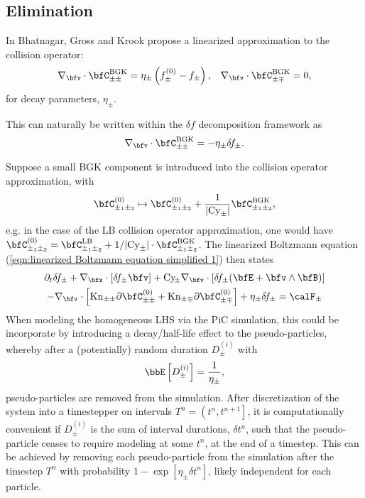 \subsection*{Elimination}
    \begin{definition}
        In \cite{Bhatnagar_Gross_Krook_1954} Bhatnagar, Gross and Krook propose a linearized approximation to the collision operator:
        \begin{align}
            \nabla_{\bfv}\cdot\bfC_{\pm\pm}^{\rm BGK}  =  \eta_{\pm}\left(f_{\pm}^{(0)} - f_{\pm}\right),  &&
            \nabla_{\bfv}\cdot\bfC_{\pm\mp}^{\rm BGK}  =  0,
        \end{align}
        for decay parameters, $\eta_{\pm}$.
    \end{definition}
    This can naturally be written within the $\delta\!f$ decomposition framework as
    \begin{equation}
        \nabla_{\bfv}\cdot\bfC_{\pm\pm}^{\rm BGK}  =  - \eta_{\pm}\delta\!f_{\pm}.
    \end{equation}

    \shortline

    Suppose a small BGK component is introduced into the collision operator approximation, with
    \begin{equation}
        \bfC_{\pm_{1}\pm_{2}}^{(0)}  \mapsto  \bfC_{\pm_{1}\pm_{2}}^{(0)} + \frac{1}{|\rmCy_{\pm}|}\bfC_{\pm_{1}\pm_{2}}^{\rm BGK},
    \end{equation}
    e.g. in the case of the LB collision operator approximation, one would have $\bfC_{\pm_{1}\pm_{2}}^{(0)} = \bfC_{\pm_{1}\pm_{2}}^{\rm LB} + 1/|\rmCy_{\pm}|\cdot\bfC_{\pm_{1}\pm_{2}}^{\rm BGK}$. The linearized Boltzmann equation (\ref{eqn:linearized Boltzmann equation simplified 1}) then states
    \begin{multline}
        \partial_{t}\delta\!f_{\pm}
        + \nabla_{\bfx}\cdot[\delta\!f_{\pm}\bfv]
        + \rmCy\!_{\pm}\nabla_{\bfv}\cdot[\delta\!f_{\pm}(\bfE + \bfv\wedge\bfB)]  \\
        - \nabla_{\bfv}\cdot\left[\rmKn_{\pm\pm}\partial\bfC_{\pm\pm}^{(0)} + \rmKn_{\pm\mp}\partial\bfC_{\pm\mp}^{(0)}\right]
        + \eta_{\pm}\delta\!f_{\pm}
        =  \calF_{\pm}
    \end{multline}
    When modeling the homogeneous LHS via the PiC simulation, this could be incorporate by introducing a decay/half-life effect to the pseudo-particles, whereby after a (potentially) random duration $D_{\pm}^{(i)}$ with
    \begin{equation}
        \bbE\left[D_{\pm}^{(i)}\right] = \frac{1}{\eta_{\pm}},
    \end{equation}
    pseudo-particles are removed from the simulation. After discretization of the system into a timestepper on intervals $T^{n} = \left(t^{n}, t^{n + 1}\right]$, it is computationally convenient if $D_{\pm}^{(i)}$ is the sum of interval durations, $\delta t^{n}$, such that the pseudo-particle ceases to require modeling at some $t^{n}$, at the end of a timestep. This can be achieved by removing each pseudo-particle from the simulation after the timestep $T^{n}$ with probability $1 - \exp\left[\eta_{\pm}\delta t^{n}\right]$, likely independent for each particle.
    
